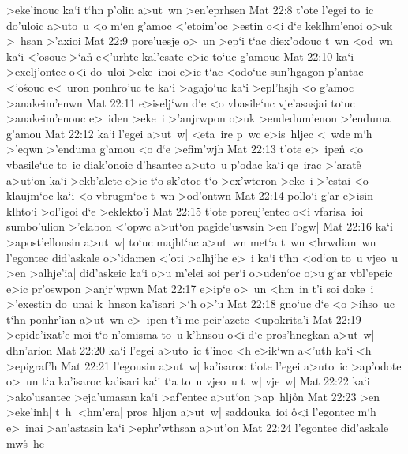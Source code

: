 >eke'inouc
ka`i
t`hn
p'olin
a>ut~wn
>en'eprhsen\bibvsend
\vs Mat 22:8
t'ote
l'egei
to~ic
do'uloic
a>uto~u
<o
m`en
g'amoc
<'etoim'oc
>estin
o<i
d`e
keklhm'enoi
o>uk
>~hsan
>'axioi\bibvsend
\vs Mat 22:9
pore'uesje
o>~un
>ep`i
t`ac
diex'odouc
t~wn
<od~wn
ka`i
<'osouc
>`a\r{n}
e<'urhte
kal'esate
e>ic
to`uc
g'amouc\bibvsend
\vs Mat 22:10
ka`i
>exelj'ontec
o<i
do~uloi
>eke~inoi
e>ic
t`ac
<odo`uc
sun'hgagon
p'antac
<'o\r{s}ouc
e<~uron
ponhro'uc
te
ka`i
>agajo`uc
ka`i
>epl'hsjh
<o
g'amoc
>anakeim'enwn\bibvsend
\vs Mat 22:11
e>iselj`wn
d`e
<o
vbasile`uc
vje'asasjai
to`uc
>anakeim'enouc
e>~iden
>eke~i
>'anjrwpon
o>uk
>endedum'enon
>'enduma
g'amou\bibvsend
\vs Mat 22:12
ka`i
l'egei
a>ut~w|
<eta~ire
p~wc
e>is~hljec
<~wde
m`h
>'eqwn
>'enduma
g'amou
<o
d`e
>efim'wjh\bibvsend
\vs Mat 22:13
t'ote
e>~ipen\r{}
<o
vbasile`uc
to~ic
diak'onoic
d'hsantec
a>uto~u
p'odac
ka`i
qe~irac
>'arate\r{}
a>ut`on
ka`i
>ekb'alete
e>ic
t`o
sk'otoc
t`o
>ex'wteron
>eke~i
>'estai
<o
klaujm`oc
ka`i
<o
vbrugm`oc
t~wn
>od'ontwn\bibvsend
\vs Mat 22:14
pollo`i
g'ar
e>isin
klhto`i
>ol'igoi
d`e
>eklekto'i\bibvsend
\vs Mat 22:15
t'ote
poreuj'entec
o<i
vfarisa~ioi
sumbo'ulion
>'elabon
<'opwc
a>ut`on
pagide'uswsin
>en
l'ogw|\bibvsend
\vs Mat 22:16
ka`i
>apost'ellousin
a>ut~w|
to`uc
majht`ac
a>ut~wn
met`a
t~wn
<hrwdian~wn
l'egontec
did'askale
o>'idamen
<'oti
>alhj`hc
e>~i
ka`i
t`hn
<od`on
to~u
vjeo~u
>en
>alhje'ia|
did'askeic
ka`i
o>u
m'elei
soi
per`i
o>uden`oc
o>u
g`ar
vbl'epeic
e>ic
pr'oswpon
>anjr'wpwn\bibvsend
\vs Mat 22:17
e>ip`e
o>~un
<hm~in
t'i
soi
doke~i
>'exestin
do~unai
k~hnson
ka'isari
>`h
o>'u\bibvsend
\vs Mat 22:18
gno`uc
d`e
<o
>ihso~uc
t`hn
ponhr'ian
a>ut~wn
e>~ipen
t'i
me
peir'azete
<upokrita'i\bibvsend
\vs Mat 22:19
>epide'ixat'e
moi
t`o
n'omisma
to~u
k'hnsou
o<i
d`e
pros'hnegkan
a>ut~w|
dhn'arion\bibvsend
\vs Mat 22:20
ka`i
l'egei
a>uto~ic
t'inoc
<h
e>ik`wn
a<'uth
ka`i
<h
>epigraf'h\bibvsend
\vs Mat 22:21
l'egousin
a>ut~w|
ka'isaroc
t'ote
l'egei
a>uto~ic
>ap'odote
o>~un
t`a
ka'isaroc
ka'isari
ka`i
t`a
to~u
vjeo~u
t~w|
vje~w|\bibvsend
\vs Mat 22:22
ka`i
>ako'usantec
>eja'umasan
ka`i
>af'entec
a>ut`on
>ap~hlj\r{o}n\bibvsend
{}
\vs Mat 22:23
>en
>eke'inh|
t~h|
<hm'era|
pros~hljon
a>ut~w|
saddouka~ioi
\r{o}<i
l'egontec
m`h
e>~inai
>an'astasin
ka`i
>ephr'wthsan
a>ut'on\bibvsend
\vs Mat 22:24
l'egontec
did'askale
mw\r{s}~hc
